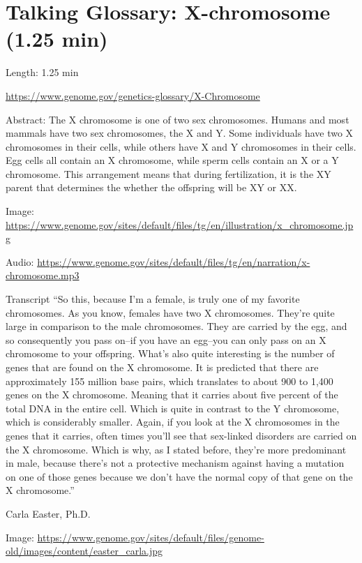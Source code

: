 \documentclass[
]{book}
\begin{document}
\hypertarget{talking-glossary-x-chromosome-1.25-min}{%
\section{Talking Glossary: X-chromosome (1.25 min)}\label{talking-glossary-x-chromosome-1.25-min}}

Length: 1.25 min

\url{https://www.genome.gov/genetics-glossary/X-Chromosome}

Abstract: The X chromosome is one of two sex chromosomes. Humans and most mammals have two sex chromosomes, the X and Y. Some individuals have two X chromosomes in their cells, while others have X and Y chromosomes in their cells. Egg cells all contain an X chromosome, while sperm cells contain an X or a Y chromosome. This arrangement means that during fertilization, it is the XY parent that determines the whether the offspring will be XY or XX.

Image: \url{https://www.genome.gov/sites/default/files/tg/en/illustration/x_chromosome.jpg}

Audio: \url{https://www.genome.gov/sites/default/files/tg/en/narration/x-chromosome.mp3}

Transcript
``So this, because I'm a female, is truly one of my favorite chromosomes. As you know, females have two X chromosomes. They're quite large in comparison to the male chromosomes. They are carried by the egg, and so consequently you pass on--if you have an egg--you can only pass on an X chromosome to your offspring. What's also quite interesting is the number of genes that are found on the X chromosome. It is predicted that there are approximately 155 million base pairs, which translates to about 900 to 1,400 genes on the X chromosome. Meaning that it carries about five percent of the total DNA in the entire cell. Which is quite in contrast to the Y chromosome, which is considerably smaller. Again, if you look at the X chromosomes in the genes that it carries, often times you'll see that sex-linked disorders are carried on the X chromosome. Which is why, as I stated before, they're more predominant in male, because there's not a protective mechanism against having a mutation on one of those genes because we don't have the normal copy of that gene on the X chromosome.''

Carla Easter, Ph.D.

Image: \url{https://www.genome.gov/sites/default/files/genome-old/images/content/easter_carla.jpg}
\end{document}
